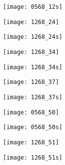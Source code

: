 \texttt{[image: 0568\_12s]}

\texttt{[image: 1268\_24]}

\texttt{[image: 1268\_24s]}

\texttt{[image: 1268\_34]}

\texttt{[image: 1268\_34s]}

\texttt{[image: 1268\_37]}

\texttt{[image: 1268\_37s]}

\texttt{[image: 0568\_50]}

\texttt{[image: 0568\_50s]}

\texttt{[image: 1268\_51]}

\texttt{[image: 1268\_51s]}









%



